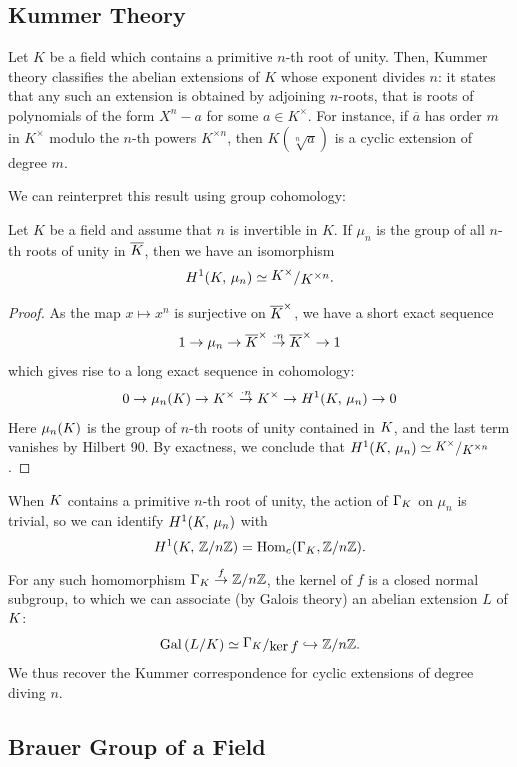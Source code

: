 \documentclass[a4paper, oneside]{memoir}
\begin{document}
\subsection{Kummer Theory}

Let $K$ be a field which contains a primitive $n$-th root of unity. Then, Kummer theory classifies the abelian extensions of $K$ whose exponent divides $n$: it states that any such
an extension is obtained by adjoining $n$-roots, that is roots of polynomials of the form $X^n-a$ for some $a\in K^\times$. For instance, if $\overline{a}$ has order $m$ in $K^\times$ modulo the $n$-th powers $K^{\times n}$, then $K(\sqrt[n]{a})$ is a cyclic extension of degree $m$.

We can reinterpret this result using group cohomology:
\begin{proposition}\label{prop:Kummer}
	Let $K$ be a field and assume that $n$ is invertible in $K$.
	If $\mu_n$ is the group of all $n$-th roots of unity in $\overline{K}$, then we have an isomorphism
	\[
		\H{1}{\K}{\mu_n}\simeq \ssfrac{\K^\times}{\K^{\times n}}.
	\]
\end{proposition}

\begin{proof}
	As the map $x\mapsto x^n$ is surjective on $\overline{K}^\times$, we have a short exact sequence
	\[
		1\to \mu_n\to \overline{K}^\times\overset{\cdot n}{\to} \overline{K}^\times\to 1
	\]
	which gives rise to a long exact sequence in cohomology:
	\[
		0\to \mu_n(K)\to K^\times \overset{\cdot n}{\to} K^\times \to H^{1}( K, \, \mu_n )\to 0
	\]
	Here $\mu_n(K)$ is the group of $n$-th roots of unity contained in $K$, and the last term vanishes by Hilbert 90. By exactness, we conclude that $\H{1}{\K}{\mu_n}\simeq \sfrac{\K^\times}{\K^{\times n}}$.
\end{proof}

\begin{remark}
	When $K$ contains a primitive $n$-th root of unity, the action of $\Gamma_K$ on $\mu_n$ is trivial, so we can identify $H^{1}( K, \, \mu_n )$ with \[H^{1}( K, \, \mathbb{Z}/n\mathbb{Z} )=\operatorname{Hom}_{c}(\Gamma_K,\mathbb{Z}/n\mathbb{Z}).\]
	For any such homomorphism $\Gamma_K\overset{f}{\to}\mathbb{Z}/n\mathbb{Z}$, the kernel of $f$ is a closed normal subgroup, to which we can associate (by Galois theory) an abelian extension $L$ of $K$:
	\[
		\operatorname{Gal}{(L/\K)}\simeq \ssfrac{\Gamma_\K}{\ker{f}}\hookrightarrow \Zn.
	\]
	We thus recover the Kummer correspondence for cyclic extensions of degree diving $n$.
\end{remark}

\subsection{Brauer Group of a Field}
\end{document}
